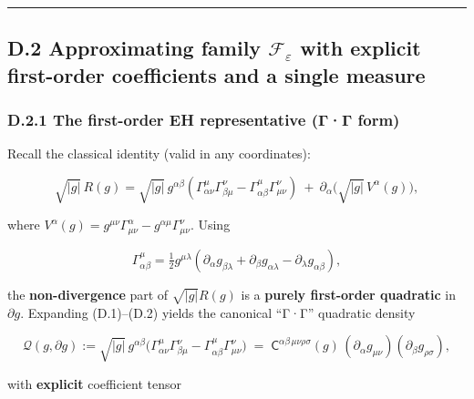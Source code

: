 \documentclass[
]{article}
\numberwithin{equation}{section}
\begin{document}
\begin{center}\rule{0.5\linewidth}{0.5pt}\end{center}

\hypertarget{d.2-approximating-family-mathcal-f_varepsilon-with-explicit-first-order-coefficients-and-a-single-measure}{%
\subsection{\texorpdfstring{D.2 Approximating family
\(\mathcal F_\varepsilon\) with \textbf{explicit first-order}
coefficients and a \textbf{single
measure}}{D.2 Approximating family \textbackslash mathcal F\_\textbackslash varepsilon with explicit first-order coefficients and a single measure}}\label{d.2-approximating-family-mathcal-f_varepsilon-with-explicit-first-order-coefficients-and-a-single-measure}}

\hypertarget{d.2.1-the-first-order-eh-representative-ux3b3ux3b3-form}{%
\subsubsection{D.2.1 The first-order EH representative (Γ·Γ
form)}\label{d.2.1-the-first-order-eh-representative-ux3b3ux3b3-form}}

Recall the classical identity (valid in any coordinates):

\[
\sqrt{|g|}\,R(g)
=\sqrt{|g|}\,g^{\alpha\beta}\!\left(\Gamma^\mu_{\alpha\nu}\Gamma^\nu_{\beta\mu}-\Gamma^\mu_{\alpha\beta}\Gamma^\nu_{\mu\nu}\right)
\ +\ \partial_\alpha\!\big(\sqrt{|g|}\,V^\alpha(g)\big),
\tag{D.1}
\]

where
\(V^\alpha(g)=g^{\mu\nu}\Gamma^\alpha_{\mu\nu}-g^{\alpha\mu}\Gamma^\nu_{\mu\nu}\).
Using

\[
\Gamma^\mu_{\alpha\beta}=\tfrac12 g^{\mu\lambda}\!\left(\partial_\alpha g_{\beta\lambda}+\partial_\beta g_{\alpha\lambda}-\partial_\lambda g_{\alpha\beta}\right),
\tag{D.2}
\]

the \textbf{non-divergence} part of \(\sqrt{|g|}R(g)\) is a
\textbf{purely first-order quadratic} in \(\partial g\). Expanding
(D.1)--(D.2) yields the canonical ``Γ·Γ'' quadratic density

\[
\boxed{\;
\mathcal Q(g,\partial g)
:=\sqrt{|g|}\,g^{\alpha\beta}
\Big(\Gamma^\mu_{\alpha\nu}\Gamma^\nu_{\beta\mu}-\Gamma^\mu_{\alpha\beta}\Gamma^\nu_{\mu\nu}\Big)
\;=\; \mathsf C^{\alpha\beta\,\mu\nu\rho\sigma}(g)\,(\partial_\alpha g_{\mu\nu})(\partial_\beta g_{\rho\sigma}),
\;}
\tag{D.3}
\]

with \textbf{explicit} coefficient tensor
\end{document}
